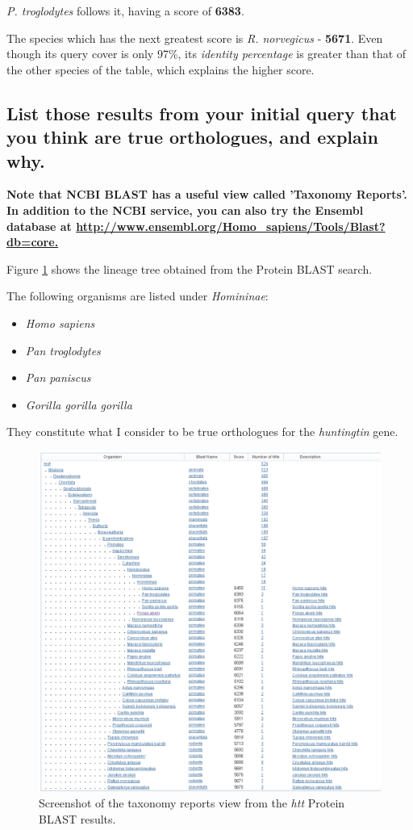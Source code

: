 \textit{P. troglodytes} follows it, having a score of \textbf{6383}.

The species which has the next greatest score is \textit{R. norvegicus} - \textbf{5671}. Even though its query cover is only 97\%, its \textit{identity percentage} is greater than that of the other species of the table, which explains the higher score.


\subsection{List those results from your initial query that you think are true orthologues, and explain why.}

\textbf{Note that NCBI BLAST has a useful view called 'Taxonomy Reports'. In addition to the NCBI service, you can also try the Ensembl database at \url{http://www.ensembl.org/Homo_sapiens/Tools/Blast?db=core.}}

Figure \ref{fig:blastp-taxonomy-view} shows the lineage tree obtained from the Protein BLAST search.

The following organisms are listed under \textit{Homininae}:

\begin{multicols}{2}
    \begin{itemize}
        \item \textit{Homo sapiens}
        \item \textit{Pan troglodytes}
        \item \textit{Pan paniscus}
        \item \textit{Gorilla gorilla gorilla}
    \end{itemize}
\end{multicols}

They constitute what I consider to be true orthologues for the \textit{huntingtin} gene.

\begin{figure}[ht]
    \centering
    \includegraphics[width=\linewidth]{res/blastp-taxonomy-view.png}
    \caption{Screenshot of the taxonomy reports view from the \textit{htt} Protein BLAST results.}
    \label{fig:blastp-taxonomy-view}
\end{figure}

\newpage
